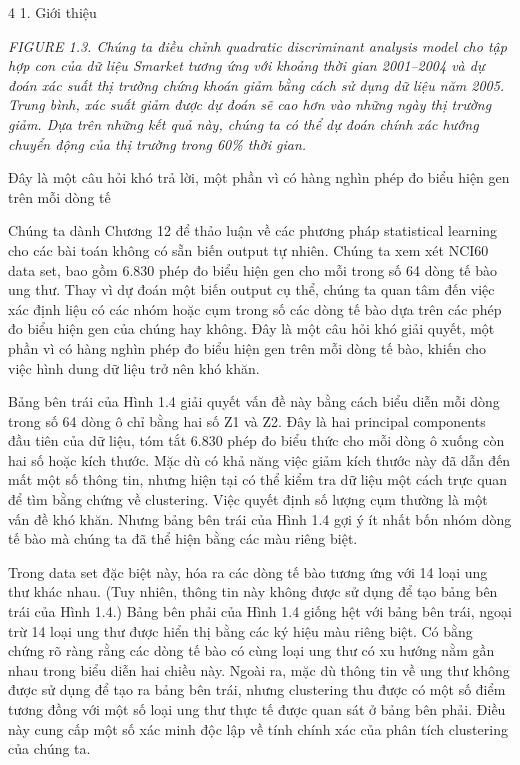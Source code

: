 4 1. Giới thiệu

\noindent\textit{FIGURE 1.3. Chúng ta điều chỉnh quadratic discriminant analysis model cho tập hợp con của dữ liệu Smarket tương ứng với khoảng thời gian 2001–2004 và dự đoán xác suất thị trường chứng khoán giảm bằng cách sử dụng dữ liệu năm 2005. Trung bình, xác suất giảm được dự đoán sẽ cao hơn vào những ngày thị trường giảm. Dựa trên những kết quả này, chúng ta có thể dự đoán chính xác hướng chuyển động của thị trường trong 60\% thời gian.}

Đây là một câu hỏi khó trả lời, một phần vì có hàng nghìn phép đo biểu hiện gen trên mỗi dòng tế

Chúng ta dành Chương 12 để thảo luận về các phương pháp statistical learning cho các bài toán không có sẵn biến output tự nhiên. Chúng ta xem xét NCI60 data set, bao gồm 6.830 phép đo biểu hiện gen cho mỗi trong số 64 dòng tế bào ung thư. Thay vì dự đoán một biến output cụ thể, chúng ta quan tâm đến việc xác định liệu có các nhóm hoặc cụm trong số các dòng tế bào dựa trên các phép đo biểu hiện gen của chúng hay không. Đây là một câu hỏi khó giải quyết, một phần vì có hàng nghìn phép đo biểu hiện gen trên mỗi dòng tế bào, khiến cho việc hình dung dữ liệu trở nên khó khăn.

Bảng bên trái của Hình 1.4 giải quyết vấn đề này bằng cách biểu diễn mỗi dòng trong số 64 dòng ô chỉ bằng hai số Z1 và Z2. Đây là hai principal components đầu tiên của dữ liệu, tóm tắt 6.830 phép đo biểu thức cho mỗi dòng ô xuống còn hai số hoặc kích thước. Mặc dù có khả năng việc giảm kích thước này đã dẫn đến mất một số thông tin, nhưng hiện tại có thể kiểm tra dữ liệu một cách trực quan để tìm bằng chứng về clustering. Việc quyết định số lượng cụm thường là một vấn đề khó khăn. Nhưng bảng bên trái của Hình 1.4 gợi ý ít nhất bốn nhóm dòng tế bào mà chúng ta đã thể hiện bằng các màu riêng biệt.

Trong data set đặc biệt này, hóa ra các dòng tế bào tương ứng với 14 loại ung thư khác nhau. (Tuy nhiên, thông tin này không được sử dụng để tạo bảng bên trái của Hình 1.4.) Bảng bên phải của Hình 1.4 giống hệt với bảng bên trái, ngoại trừ 14 loại ung thư được hiển thị bằng các ký hiệu màu riêng biệt. Có bằng chứng rõ ràng rằng các dòng tế bào có cùng loại ung thư có xu hướng nằm gần nhau trong biểu diễn hai chiều này. Ngoài ra, mặc dù thông tin về ung thư không được sử dụng để tạo ra bảng bên trái, nhưng clustering thu được có một số điểm tương đồng với một số loại ung thư thực tế được quan sát ở bảng bên phải. Điều này cung cấp một số xác minh độc lập về tính chính xác của phân tích clustering của chúng ta.


